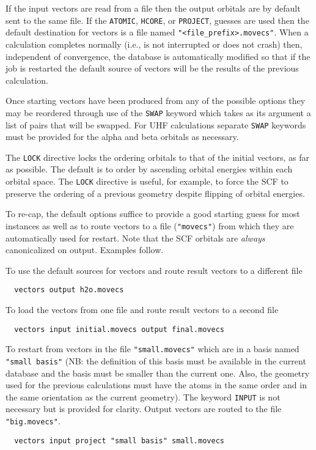 If the input vectors are read from a file then the output orbitals are
by default sent to the same file.  If the \verb+ATOMIC+, \verb+HCORE+,
or \verb+PROJECT+, guesses are used then the default destination for
vectors is a file named \verb+"<file_prefix>.movecs"+.  When a
calculation completes normally (i.e., is not interrupted or does not
crash) then, independent of convergence, the database is automatically
modified so that if the job is restarted the default source of vectors
will be the results of the previous calculation.

Once starting vectors have been produced from any of the possible
options they may be reordered through use of the \verb+SWAP+ keyword
which takes as its argument a list of pairs that will be swapped.
For UHF calculations separate \verb+SWAP+ keywords must be provided
for the alpha and beta orbitals as necessary.

The \verb+LOCK+ directive locks the ordering orbitals to that of the
initial vectors, as far as possible. The default is to order by
ascending orbital energies within each orbital space. The \verb+LOCK+
directive is useful, for example, to force the SCF to preserve the
ordering of a previous geometry despite flipping of orbital energies.

To re-cap, the default options suffice to provide a good starting
guess for most instances as well as to route vectors to a file
(\verb+"movecs"+) from which they are automatically used for restart.
Note that the SCF orbitals are {\em always} canonicalized on output.
Examples follow.

To use the default sources for vectors and route result vectors
to a different file
\begin{verbatim}
  vectors output h2o.movecs
\end{verbatim}

To load the vectors from one file and route result vectors to a
second file
\begin{verbatim}
  vectors input initial.movecs output final.movecs
\end{verbatim}

\sloppy

To restart from vectors in the file \verb+"small.movecs"+ which are in
a basis named \verb+"small basis"+ (NB: the definition of this basis
must be available in the current database and the basis must be
smaller than the current one.  Also, the geometry used for the
previous calculations must have the atoms in the same order and in the
same orientation as the current geometry).  The keyword \verb+INPUT+
is not necessary but is provided for clarity.  Output vectors are
routed to the file \verb+"big.movecs"+.
\begin{verbatim}
  vectors input project "small basis" small.movecs
\end{verbatim}

